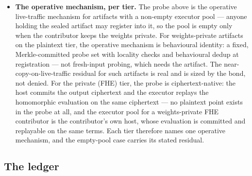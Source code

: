\documentclass[11pt]{article}
\begin{document}
\begin{itemize}
stated rather than hidden. Anyone holding the sealed artifact can register into
its executor pool. It is a paid, measured role, not a permanent
developer duty. The executor sees the probed input in plaintext
--- a further plaintext point alongside the gateway and the
serving host. The ledger never carries the answer: the answer
entry is a commitment whose opening exists only inside the
sealed replay environment. The same
data contract binds every point: no retention
beyond the session, no training. Probe coverage is itself a
ledger-measured rate. A provider that falls silent is visible.
The governance quorum re-routes the demand to another. The
residual: if every provider stops, detection degrades to disputes
alone. That is a public, measurable state, not a hidden one. The
development fund carries no per-session monitoring line.
\item \textbf{The operative mechanism, per tier.} The probe above
is the operative live-traffic mechanism for artifacts with a
non-empty executor pool --- anyone holding the sealed artifact may
register into it, so the pool is empty only when the contributor
keeps the weights private. For weights-private artifacts on the
plaintext tier, the operative mechanism is behavioural identity:
a fixed, Merkle-committed probe set with locality checks and
behavioural dedup at registration --- not fresh-input probing,
which needs the artifact. The near-copy-on-live-traffic residual
for such artifacts is real and is sized by the bond, not denied.
For the private (FHE) tier, the probe is ciphertext-native: the
host commits the output ciphertext and the executor replays the
homomorphic evaluation on the same ciphertext --- no plaintext
point exists in the probe at all, and the executor pool for a
weights-private FHE contributor is the contributor's own host,
whose evaluation is committed and replayable on the same terms.
Each tier therefore names one operative mechanism, and the
empty-pool case carries its stated residual.
\end{itemize}

\subsection{The ledger}
\end{document}
